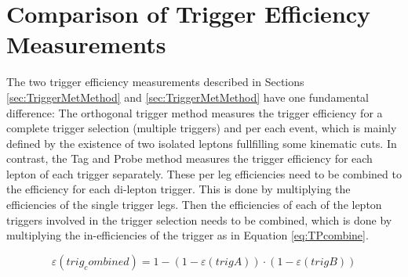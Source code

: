

\section{Comparison of Trigger Efficiency Measurements}

The two trigger efficiency measurements described in Sections \ref{sec:TriggerMetMethod} and \ref{sec:TriggerMetMethod} have one fundamental difference: The orthogonal trigger method measures the trigger efficiency for a complete trigger selection (multiple triggers) and per each event, which is mainly defined by the existence of two isolated leptons fullfilling some kinematic cuts. In contrast, the Tag and Probe method measures the trigger efficiency for each lepton of each trigger separately. These per leg efficiencies need to be combined to the efficiency for each di-lepton trigger. This is done by multiplying the efficiencies of the single trigger legs. 
Then the efficiencies of each of the lepton triggers involved in the trigger selection needs to be combined, which is done by multiplying the in-efficiencies of the trigger as in Equation \ref{eq:TPcombine}.

\begin{equation}
\varepsilon(trig_combined) = 1- (1-\varepsilon(trigA))\cdot(1- \varepsilon(trigB))
\label{eq:TPcombine}
\end{equation}
